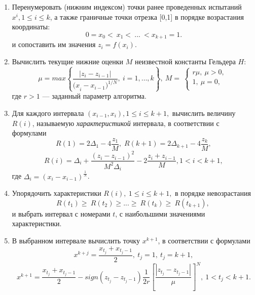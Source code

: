 \documentclass[12pt, a4paper, russian]{article}
\begin{document}
\begin{enumerate}
	
	\item  Перенумеровать (нижним индексом) точки ранее проведенных испытаний $x^i, 1\leq i\leq k$, а также граничные точки отрезка [0,1] в порядке возрастания координаты:
	\begin{equation}
		\label{agp1_sort}
		0=x_0<\ x_1<\ ...\ <x_{k+1}=1.
	\end{equation}
	и сопоставить им значения $z_i=f(x_i)$. 
	
	\item  Вычислить текущие нижние оценки $M$ неизвестной константы Гельдера $H$:
	\begin{equation}
		\label{agp2_mu}
		\mu=max\left\{\frac{|z_i-z_{i-1}|}{{{(x}_i-x_{i-1})}^{1/N}},\ i=1,\ldots,k\right\},\ M=\ \left\{\begin{matrix}r\mu,\ \mu>0,\\1,\ \mu=0,\\\end{matrix}\right.\
	\end{equation}
	где $r>1$ --- заданный параметр алгоритма.
	
	\item  Для каждого интервала $(x_{i-1},x_i), 1\leq i\leq k+1,$ вычислить величину $R(i)$, называемую \textit{характеристикой} интервала, в соответствии с формулами
	\begin{equation}
		\label{agp3_R1}
		R(1)=2\Delta_1-4\dfrac{z_1}{M}, \; R(k+1)=2\Delta_{k+1}-4\dfrac{z_k}{M},
	\end{equation}
	\begin{equation}
		\label{agp3_Ri}
		R(i)=\Delta_i+\dfrac{(z_i-z_{i-1})^2}{M^2\Delta_i}-2\dfrac{z_i+z_{i-1}}{M},1<i<k+1,
	\end{equation}
	где \(\Delta_i=(x_i-x_{i-1})^\frac{1}{N}\).
	
	\item   Упорядочить характеристики $R\left(i\right),\ 1\leq i \leq k+1,$ в порядке невозрастания 
	\begin{equation}
		\label{agp4_R_sort}
		R\left(t_1\right)\geq\ R\left(t_2\right)\geq...\geq\ R\left(t_k\right)\geq\ R(t_{k+1}),\ 
	\end{equation}	
	и выбрать интервал с номерами $t$, с наибольшими значениями характеристики.
	
	\item  В выбранном интервале вычислить точку $x^{k+1}$, в соответствии с формулами
	\begin{equation}
		\label{agp5_x1}
		x^{k+j}=\frac{x_{t_j}+x_{t_j-1}}{2},\ t_j=1,\ t_j=k+1,
	\end{equation}	
	\begin{equation}
		\label{agp4_xi}	
		x^{k+1}=\frac{x_{t_j}+x_{t_j-1}}{2}-sign\left(z_{t_j}-z_{t_j-1}\right)\frac{1}{2r}\left[\frac{\left|z_{t_j}-z_{t_j-1}\right|}{\mu}\right]^N,\ 1<t_j<k+1.
	\end{equation}	


\end{enumerate}
\end{document}
